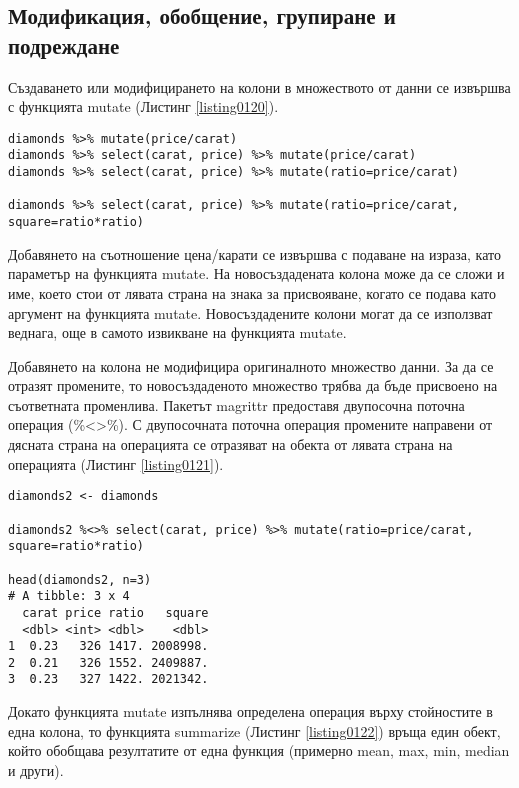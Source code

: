 \subsection{Модификация, обобщение, групиране и подреждане}

Създаването или модифицирането на колони в множеството от данни се извършва с функцията mutate (Листинг \ref{listing0120}). 

\begin{lstlisting}[caption=Модификация на колони, label=listing0120]
diamonds %>% mutate(price/carat)
diamonds %>% select(carat, price) %>% mutate(price/carat)
diamonds %>% select(carat, price) %>% mutate(ratio=price/carat)

diamonds %>% select(carat, price) %>% mutate(ratio=price/carat, square=ratio*ratio)
\end{lstlisting}

Добавянето на съотношение цена/карати се извършва с подаване на израза, като параметър на функцията mutate. На новосъздадената колона може да се сложи и име, което стои от лявата страна на знака за присвояване, когато се подава като аргумент на функцията mutate. Новосъздадените колони могат да се използват веднага, още в самото извикване на функцията mutate. 

Добавянето на колона не модифицира оригиналното множество данни. За да се отразят промените, то новосъздаденото множество трябва да бъде присвоено на съответната променлива. Пакетът magrittr предоставя двупосочна поточна операция (\%<>\%). С двупосочната поточна операция промените направени от дясната страна на операцията се отразяват на обекта от лявата страна на операцията (Листинг \ref{listing0121}). 

\begin{lstlisting}[caption=Отразяване на модификациите, label=listing0121]
diamonds2 <- diamonds

diamonds2 %<>% select(carat, price) %>% mutate(ratio=price/carat, square=ratio*ratio)

head(diamonds2, n=3)
# A tibble: 3 x 4
  carat price ratio   square
  <dbl> <int> <dbl>    <dbl>
1  0.23   326 1417. 2008998.
2  0.21   326 1552. 2409887.
3  0.23   327 1422. 2021342.
\end{lstlisting}

Докато функцията mutate изпълнява определена операция върху стойностите в една колона, то функцията summarize (Листинг \ref{listing0122}) връща един обект, който обобщава резултатите от една функция (примерно mean, max, min, median и други). 

